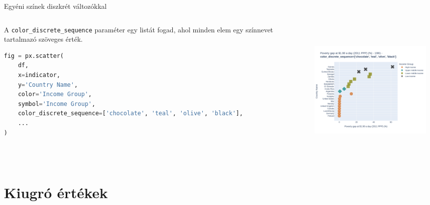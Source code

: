 \documentclass[english, aspectratio=169]{beamer}
\makeatletter
\let\origtableofcontents=\tableofcontents
\def\tableofcontents{\@ifnextchar[{\origtableofcontents}{\gobbletableofcontents}}
\def\gobbletableofcontents#1{\origtableofcontents}
\makeatother
\begin{document}
	\begin{frame}[fragile]{Egyéni színek diszkrét változókkal}
		\begin{columns}
			\begin{column}{.5\textwidth}
				A \texttt{color\_discrete\_sequence} paraméter egy listát fogad, ahol minden elem egy színnevet tartalmazó szöveges érték.\par\medskip
				\begin{lstlisting}[language=python]
fig = px.scatter(
	df,
	x=indicator,
	y='Country Name',
	color='Income Group',
	symbol='Income Group',
	color_discrete_sequence=['chocolate', 'teal', 'olive', 'black'],
	...
)
				\end{lstlisting}
			\end{column}
			\begin{column}{.5\textwidth}
				\begin{center}
					\includegraphics[width=7cm, height=7cm, keepaspectratio]{images/scatter_12.png}
				\end{center}
			\end{column}
		\end{columns}
	\end{frame}
	
	\section{Kiugró értékek}
	
	\begin{frame}{}
		\tableofcontents[currentsection]
	\end{frame}
	
\end{document}
